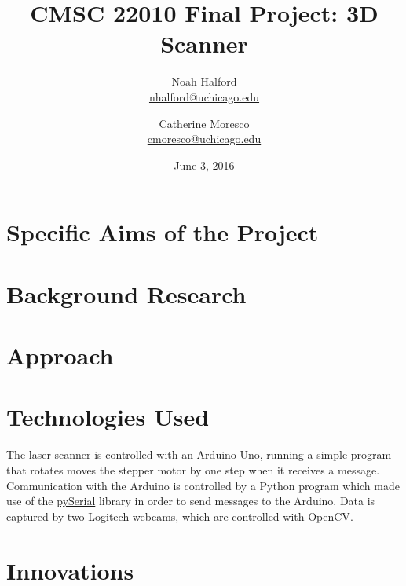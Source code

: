 \documentclass[12pt, letterpaper]{article}
\title{CMSC 22010 Final Project: 3D Scanner}
\author{Noah Halford\\
    \href{mailto:nhalford@uchicago.edu}{nhalford@uchicago.edu}
        \and
        Catherine Moresco\\
        \href{mailto:cmoresco@uchicago.edu}{cmoresco@uchicago.edu}}
\date{June 3, 2016}
\begin{document}
\maketitle

\section{Specific Aims of the Project}

\section{Background Research}

\section{Approach}

\section{Technologies Used}
The laser scanner is controlled with an Arduino Uno, running a simple program that
rotates moves the stepper motor by one step when it receives a message. Communication
with the Arduino is controlled by a Python program which made use of the
\href{https://github.com/pyserial/pyserial}{pySerial} library in order to send messages
to the Arduino. Data is captured by two Logitech webcams, which are controlled with
\href{http://opencv.org}{OpenCV}.

\section{Innovations}

\end{document}
